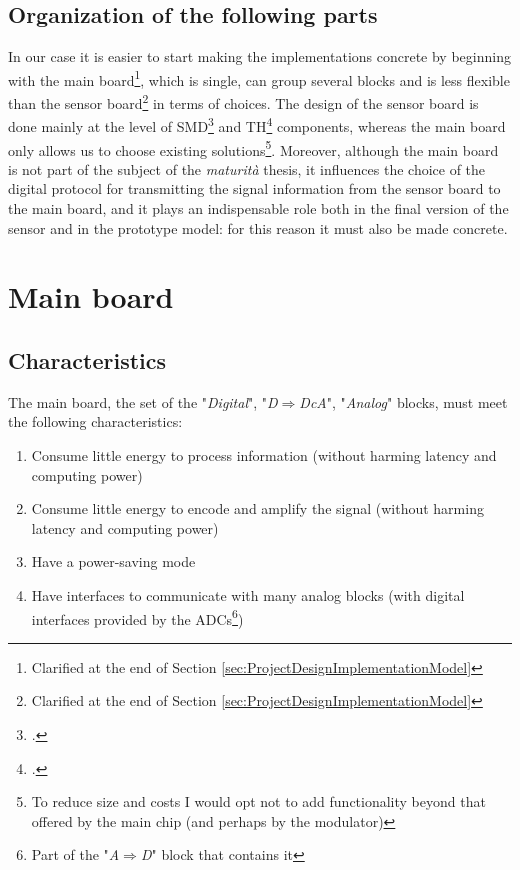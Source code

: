 \documentclass[a4paper, 10pt, final]{article} %
\begin{document}
    \subsection{Organization of the following parts}
    In our case it is easier to start making the implementations concrete by beginning with the main board\footnote{Clarified at the end of Section \ref{sec:ProjectDesignImplementationModel}}, which is single, can group several blocks and is less flexible than the sensor board\footnote{Clarified at the end of Section \ref{sec:ProjectDesignImplementationModel}} in terms of choices.
    The design of the sensor board is done mainly at the level of SMD\footcite[]{SMT:Wiki} and TH\footcite[]{THT:Wiki} components, whereas the main board only allows us to choose existing solutions\footnote{To reduce size and costs I would opt not to add functionality beyond that offered by the main chip (and perhaps by the modulator)}.
    Moreover, although the main board is not part of the subject of the \emph{maturit\`{a}} thesis, it influences the choice of the digital protocol for transmitting the signal information from the sensor board to the main board, and it plays an indispensable role both in the final version of the sensor and in the prototype model: for this reason it must also be made concrete.

    \section{Main board}\label{sec:Motherboard}
    \begin{samepage}
        \subsection{Characteristics}\label{sec:MotherboardCharacteristics}
            The main board, the set of the "\emph{Digital}", "\emph{D$\Rightarrow$DcA}", "\emph{Analog}" blocks, must meet the following characteristics:
            \begin{enumerate}[label=\emph{(\arabic*)}]
                \item Consume little energy to process information (without harming latency and computing power)
                \item Consume little energy to encode and amplify the signal (without harming latency and computing power)
                \item Have a power-saving mode
                \item Have interfaces to communicate with many analog blocks (with digital interfaces provided by the ADCs\footnote{Part of the "\emph{A$\Rightarrow$D}" block that contains it})
            \end{enumerate}
    \end{samepage}
\end{document}
